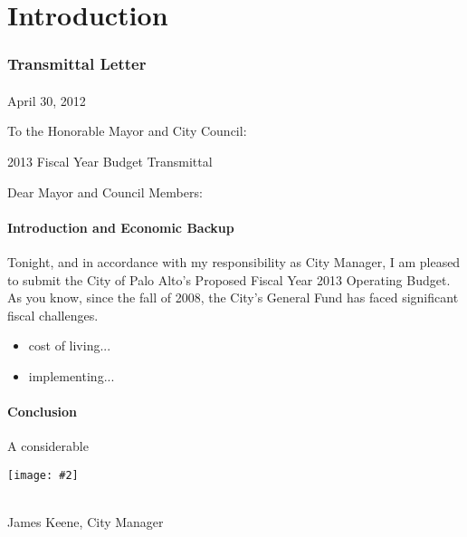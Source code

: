 
\nonstopmode

\usepackage{graphicx}
\usepackage[space]{grffile}
\usepackage{adjustbox}
\newcommand*{\includeimg}[2][]{%
    \begin{adjustbox}{max size={\textwidth}{\textheight}}
        \texttt{[image: \#2]}%
    \end{adjustbox}
}

\part{Introduction}
\section{Transmittal Letter}
\subsection{}
{\itshape{
April 30, 2012 

 To the Honorable Mayor and City Council: 

 2013 Fiscal Year Budget Transmittal 

Dear Mayor and Council Members: 


}}
\subsection{Introduction and Economic Backup}
Tonight, and in accordance with my responsibility as City Manager, I am pleased to submit the City of Palo Alto's Proposed Fiscal Year 2013 Operating Budget. As you know, since the fall of 2008, the City's General Fund has faced significant fiscal challenges.

\begin{itemize}
\bulletl
\item cost of living...
\item implementing...
\end{itemize}
\subsection{Conclusion}
A considerable\\
{\includeimg[height=1in, width=2in]{JamesKeeneSig.png}}
\\James Keene, City Manager
